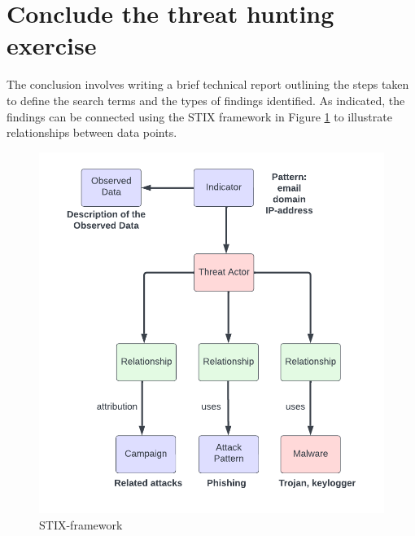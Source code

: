 \documentclass{article}
\begin{document}
	\section*{Conclude the threat hunting exercise}
	The conclusion involves writing a brief technical report outlining the steps taken to define the search terms and the types of findings identified. As indicated, the findings can be connected using the STIX framework in Figure \ref{STIX-framework} to illustrate relationships between data points.
		
		\begin{figure}[!htb]
			\centering
			\includegraphics[width=\linewidth]{stix.png}
			\caption{STIX-framework}
			\label{STIX-framework}
		\end{figure}
	
\end{document}
